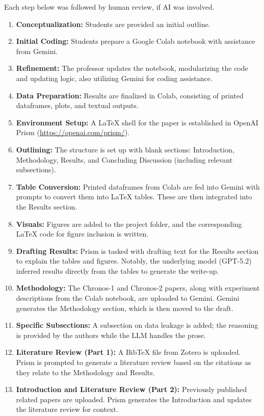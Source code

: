 \documentclass[twocolumn]{article}
\begin{document}
Each step below was followed by human review, if AI was involved. 

\begin{enumerate}[label=\arabic*.]
    \item \textbf{Conceptualization:} Students are provided an initial outline.
    \item \textbf{Initial Coding:} Students prepare a Google Colab notebook with assistance from Gemini.
    \item \textbf{Refinement:} The professor updates the notebook, modularizing the code and updating logic, also utilizing Gemini for coding assistance.
    \item \textbf{Data Preparation:} Results are finalized in Colab, consisting of printed dataframes, plots, and textual outputs.
    \item \textbf{Environment Setup:} A \LaTeX{} shell for the paper is established in OpenAI Prism (\url{https://openai.com/prism/}).
    \item \textbf{Outlining:} The structure is set up with blank sections: Introduction, Methodology, Results, and Concluding Discussion (including relevant subsections).
    \item \textbf{Table Conversion:} Printed dataframes from Colab are fed into Gemini with prompts to convert them into \LaTeX{} tables. These are then integrated into the Results section.
    \item \textbf{Visuals:} Figures are added to the project folder, and the corresponding \LaTeX{} code for figure inclusion is written.
    \item \textbf{Drafting Results:} Prism is tasked with drafting text for the Results section to explain the tables and figures. Notably, the underlying model (GPT-5.2) inferred results directly from the tables to generate the write-up.
    \item \textbf{Methodology:} The Chronos-1 and Chronos-2 papers, along with experiment descriptions from the Colab notebook, are uploaded to Gemini. Gemini generates the Methodology section, which is then moved to the draft.
    \item \textbf{Specific Subsections:} A subsection on data leakage is added; the reasoning is provided by the authors while the LLM handles the prose.
    \item \textbf{Literature Review (Part 1):} A Bib\TeX{} file from Zotero is uploaded. Prism is prompted to generate a literature review based on the citations as they relate to the Methodology and Results.
    \item \textbf{Introduction and Literature Review (Part 2):} Previously published related papers are uploaded. Prism generates the Introduction and updates the literature review for context.

\end{enumerate}
\end{document}
